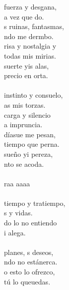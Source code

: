 \begin{cancion}%
	 fuerza y desgana,\\
	a vez que do.\\
	s ruinas,  fantasmas,\\
	ndo me dermbo.\\
	risa y  nostalgia y\\
	todas mis mirias.\\
	suerte yis alas,\\
	precio en orta.\\
\jump\\
	 instinto y consuelo,\\
	as mis torzas.\\
	 carga y silencio\\
	a impruncia.\\
	 díasue me pesan,\\
	tiempo que perna.\\
	sueño yi pereza,\\
	nto se acoda.\\
\jump\\
	 raa aaaa\\
\jump\\
	 tiempo y tratiempo,\\
	s y vidas.\\
	do lo  no entiendo\\
	i alega. \\
\jump\\
	 planes, s deseos,\\
	ndo no estánerca.\\
	o esto  lo ofrezco,\\
	 tú lo queuedas.\\\jump\\

\end{cancion}
